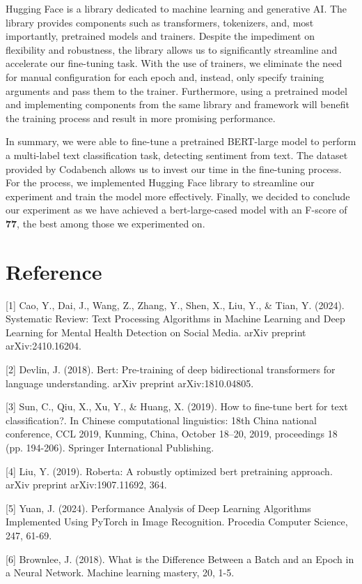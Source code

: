 \documentclass[11pt]{article}
\begin{document}
Hugging Face is a library dedicated to machine learning and generative AI. The library provides components such as transformers, tokenizers, and, most importantly, pretrained models and trainers. Despite the impediment on flexibility and robustness, the library allows us to significantly streamline and accelerate our fine-tuning task. With the use of trainers, we eliminate the need for manual configuration for each epoch and, instead, only specify training arguments and pass them to the trainer. Furthermore, using a pretrained model and implementing components from the same library and framework will benefit the training process and result in more promising performance. 

In summary, we were able to fine-tune a pretrained BERT-large model to perform a multi-label text classification task, detecting sentiment from text. The dataset provided by Codabench allows us to invest our time in the fine-tuning process. For the process, we implemented Hugging Face library to streamline our experiment and train the model more effectively. Finally, we decided to conclude our experiment as we have achieved a bert-large-cased model with an F-score of \textbf{77}, the best among those we experimented on.
\section{Reference}
[1] Cao, Y., Dai, J., Wang, Z., Zhang, Y., Shen, X., Liu, Y., \& Tian, Y. (2024). Systematic Review: Text Processing Algorithms in Machine Learning and Deep Learning for Mental Health Detection on Social Media. arXiv preprint arXiv:2410.16204.

[2] Devlin, J. (2018). Bert: Pre-training of deep bidirectional transformers for language understanding. arXiv preprint arXiv:1810.04805.

[3] Sun, C., Qiu, X., Xu, Y., \& Huang, X. (2019). How to fine-tune bert for text classification?. In Chinese computational linguistics: 18th China national conference, CCL 2019, Kunming, China, October 18–20, 2019, proceedings 18 (pp. 194-206). Springer International Publishing.

[4] Liu, Y. (2019). Roberta: A robustly optimized bert pretraining approach. arXiv preprint arXiv:1907.11692, 364.

[5] Yuan, J. (2024). Performance Analysis of Deep Learning Algorithms Implemented Using PyTorch in Image Recognition. Procedia Computer Science, 247, 61-69.

[6] Brownlee, J. (2018). What is the Difference Between a Batch and an Epoch in a Neural Network. Machine learning mastery, 20, 1-5.
\end{document}
